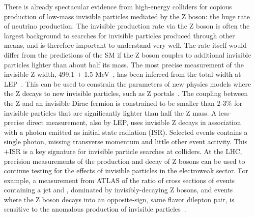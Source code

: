 There is already spectacular evidence from high-energy colliders for copious production of low-mass invisible particles mediated by the Z boson: the huge rate of neutrino production. 
The invisible production rate via the Z boson is often the largest background to searches for invisible particles produced through other means, and is therefore important to understand very well.
The rate itself would differ from the predictions of the SM if the Z boson couples to additional invisible particles lighter than about half its mass.
The most precise measurement of the invisible Z width, 499.1 $\pm$ 1.5 MeV~\cite{Patrignani:2016xqp}, has been inferred from the total width at LEP~\cite{ALEPH:2005ab}. This can be used to constrain the parameters of new physics models where the Z decays to new invisible particles, such as Z portals~\cite{Carena:2003aj,Arcadi:2014lta,Escudero:2016gzx}. The coupling between the Z and an invisible Dirac fermion is constrained to be smaller than 2-3\% for invisible particles that are significantly lighter than half the Z mass.
A less-precise direct measurement, also by LEP, uses invisible Z decays in association with a photon emitted as initial state radiation (ISR).
Selected events contains a single photon, missing transverse momentum and little other event activity. This \MET+ISR is a key signature for invisible particle searches at colliders. 
At the LHC, precision measurements of the production and decay of Z bosons can be used to continue testing for the effects of invisible particles in the electroweak sector. 
For example, a measurement from ATLAS of the ratio of cross sections of events containing a jet and \MET, dominated by invisibly-decaying Z bosons, and events where the Z boson decays into an opposite-sign, same flavor dilepton pair, is sensitive to the anomalous production of invisible particles~\cite{Aaboud:2017buf}. 

